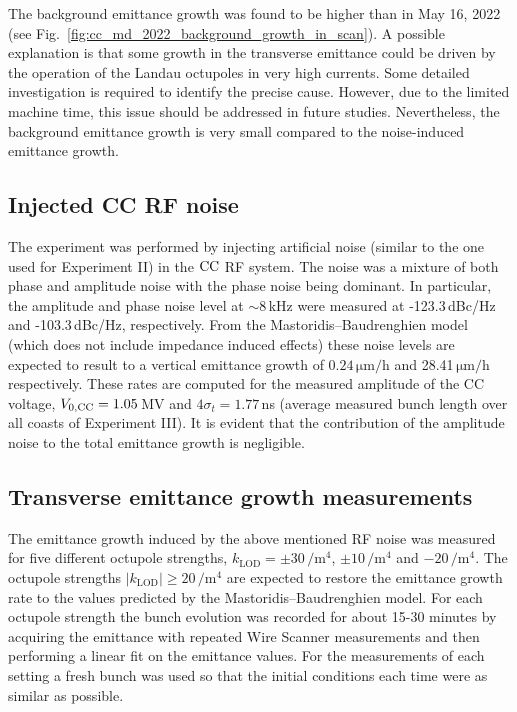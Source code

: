 The background emittance growth was found to be higher than in May 16, 2022 (see Fig.~\ref{fig:cc_md_2022_background_growth_in_scan}). A possible explanation is that some growth in the transverse emittance could be driven by the operation of the Landau octupoles in very high currents. Some detailed investigation is required to identify the precise cause. However, due to the limited machine time, this issue should be addressed in future studies. Nevertheless, the background emittance growth is very small compared to the noise-induced emittance growth. %



\subsection{Injected CC RF noise}\label{subsec:cc_rf_noise_exp3}
The experiment was performed by injecting artificial noise (similar to the one used for Experiment II) in the ${\mathrm{CC}}$ RF system. The noise was a mixture of both phase and amplitude noise with the phase noise being dominant. In particular, the amplitude and phase noise level at $\sim$8\,kHz were measured at -123.3\,dBc/Hz and -103.3\,dBc/Hz, respectively. From the Mastoridis--Baudrenghien model (which does not include impedance induced effects) these noise levels are expected to result to a vertical emittance growth of $0.24$\,$\mathrm{\mu m/h}$ and 28.41\,$\mathrm{\mu m/h}$ respectively. These rates are computed for the measured amplitude of the CC voltage, ${V_\mathrm{0, CC}}=1.05$\,MV and $4\sigma_t=1.77$\,ns (average measured bunch length over all coasts of Experiment III). It is evident that the contribution of the amplitude noise to the total emittance growth is negligible. %


\subsection{Transverse emittance growth measurements}\label{subsec:cc_rf_noise_emit_growth_exp3}
The emittance growth induced by the above mentioned RF noise was measured for five different octupole strengths, $k_\mathrm{LOD}=\pm 30$\,$\mathrm{/m^4}$, $ \pm 10$\,$\mathrm{/m^4}$ and $-20$\,$\mathrm{/m^4}$. The octupole strengths $| k_\mathrm{LOD} | \geq 20$\,$\mathrm{/m^4}$ are expected to restore the emittance growth rate to the values predicted by the Mastoridis--Baudrenghien model. For each octupole strength the bunch evolution was recorded for about 15-30 minutes by acquiring the emittance with repeated Wire Scanner measurements and then performing a linear fit on the emittance values. For the measurements of each setting a fresh bunch was used so that the initial conditions each time were as similar as possible.


